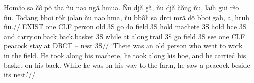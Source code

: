 \ex[glhangstyle=cascade]
%
\begingl
\gla
Hom\^{a}o sa \v{c}\^{o} p\^{o} tha  \~{n}u nao ng\u{a} hmua. \~{N}u
dj\u{a} g\u{a}, \~{n}u dj\u{a} \v{c}\u{o}ng \~{n}u, laih gui r\^{e}o
\~{n}u. Todang bboi r\^{o}k jolan \~{n}u nao hma, \~{n}u bb\^{o}h sa
droi mr\u{a} d\u{o} bboi gah, a, hruh \~{n}u.//
\glb
\\{exist} one \\{clf} person old \\{3s} go do field \\{3s} hold
machete \\{3s} hold hoe \\{3s} and carry.on.back back.basket \\{3s}
while at along trail \\{3s} go field \\{3s} see one \\{clf} peacock
stay at \\{drct} -- nest \\{3s}//
\glft
`There was an old person who went to work in the field. He took
along his machete, he took along his hoe, and he carried his
basket on his back. While he was on his way to the farm, he saw a
peacock beside its nest.'//
\endgl
\xe


\endinput

Hom\^{a}o sa \v{c}\^{o} p\^{o} tha  \~{n}u nao ng\u{a} hmua. \~{N}u
dj\u{a} g\u{a}, \~{n}u dj\u{a} \v{c}\u{o}ng \~{n}u, laih gui r\^{e}o
\~{n}u. Todang bboi r\^{o}k jolan \~{n}u nao hma, \~{n}u bb\^{o}h sa
droi mr\u{a} d\u{o} bboi gah, a, hruh \~{n}u.//

{\sc exist} one {\sc clf} person old {\sc 3s} go do field {\sc 3s} hold
machete {\sc 3s} hold hoe {\sc 3s} and carry.on.back back.basket \sc 3s
while at along trail {\sc 3s} go field {\sc 3s} see one {\sc clf} peacock
stay at {\sc drct} -- nest {\sc 3s} //

\secno=6

\section section

\subsection subsection

\subsection subsection\deftagsec{subsection}
\deftag{\currsec}{AA}
\writeln{\meaning\currsec}
\writeln{currsec: \currsec}

\subsection subsection

\getref{subsection}

\endinput


\ex
\begingl
\glpreamble ggg ggg//
\glft This is a free translation.//
\endgl
\xe



